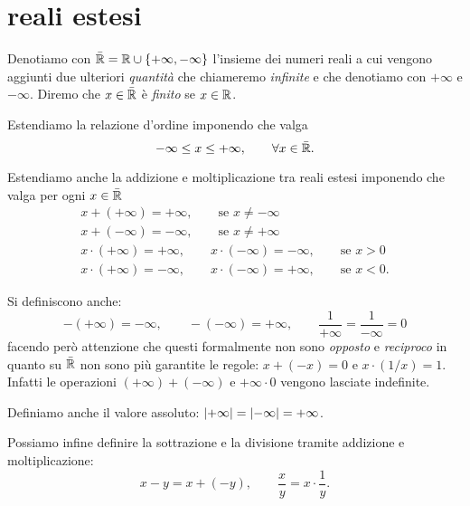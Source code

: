 \section{reali estesi}


\begin{definition}
\mymargin{$\bar{\RR}$}
Denotiamo con $\bar {\mathbb R}=\mathbb R \cup {\left\{ +\infty, -\infty \right\}}$ l'insieme dei numeri reali
\mymargin{$+\infty$, $-\infty$}
a cui vengono aggiunti due ulteriori \emph{quantità} che chiameremo
\emph{infinite} e che denotiamo con $+\infty$ e $-\infty$.
Diremo che $x\in \bar {\mathbb R}$ è \emph{finito} se $x\in \mathbb R$.
\end{definition}


Estendiamo la relazione d'ordine imponendo che valga
\[
  -\infty \le x \le +\infty, \qquad \forall x \in \bar{\mathbb R}.
\]

Estendiamo anche la addizione e moltiplicazione
tra reali estesi imponendo che valga per ogni $x\in \bar {\mathbb R}$
\begin{gather*}
  x + (+\infty) = +\infty, \qquad \text{se $x\neq -\infty$}\\
  x + (-\infty) = -\infty, \qquad \text{se $x\neq +\infty$}\\
  x \cdot (+\infty) = +\infty, \qquad
  x \cdot (-\infty) = -\infty, \qquad \text{se $x>0$} \\
  x \cdot (+\infty) = -\infty, \qquad
  x \cdot (-\infty) = +\infty, \qquad \text{se $x<0$}.
\end{gather*}

Si definiscono anche:
\[
 -(+\infty) = -\infty, \qquad
 -(-\infty) = +\infty, \qquad
 \frac{1}{+\infty} = \frac{1}{-\infty}=0
\]
facendo però attenzione che
questi formalmente non sono \emph{opposto}
e \emph{reciproco} in quanto
su $\bar {\mathbb R}$ non sono più garantite
le regole: $x + (-x) = 0$ e $x \cdot (1/x) = 1$.
Infatti
le operazioni $(+\infty) + (-\infty)$ e $+\infty \cdot 0$ vengono
lasciate indefinite.

Definiamo anche il valore assoluto: ${\left|+\infty\right|} = {\left|-\infty\right|} = +\infty$.

Possiamo infine definire la sottrazione e la divisione tramite
addizione e moltiplicazione:
\[
  x - y = x + (-y), \qquad \frac{x}{y} = x \cdot \frac{1}{y}.
\]

